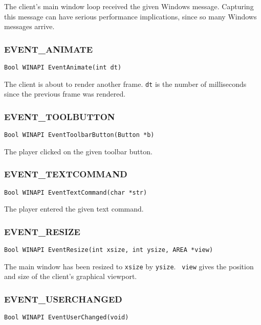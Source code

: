 The client's main window loop received the given Windows message.
Capturing this message can have serious performance implications,
since so many Windows messages arrive.

\subsubsection{EVENT\_ANIMATE}
\begin{verbatim}
Bool WINAPI EventAnimate(int dt)
\end{verbatim}

The client is about to render another frame.  {\tt dt} is the number
of milliseconds since the previous frame was rendered.

\subsubsection{EVENT\_TOOLBUTTON}
\begin{verbatim}
Bool WINAPI EventToolbarButton(Button *b)
\end{verbatim}

The player clicked on the given toolbar button.

\subsubsection{EVENT\_TEXTCOMMAND} 
\begin{verbatim}
Bool WINAPI EventTextCommand(char *str)
\end{verbatim}

The player entered the given text command.

\subsubsection{EVENT\_RESIZE}
\begin{verbatim}
Bool WINAPI EventResize(int xsize, int ysize, AREA *view)
\end{verbatim}

The main window has been resized to {\tt xsize} by {\tt ysize}.  {\tt
view} gives the position and size of the client's graphical viewport.

\subsubsection{EVENT\_USERCHANGED}
\begin{verbatim}
Bool WINAPI EventUserChanged(void)
\end{verbatim}

